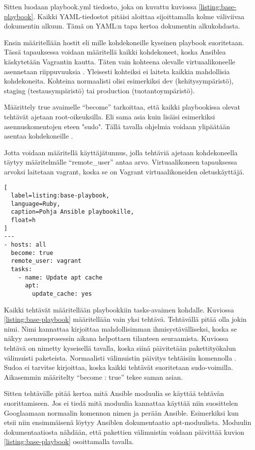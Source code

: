 Sitten luodaan playbook.yml tiedosto, joka on kuvattu kuviossa \ref{listing:base-playbook}. Kaikki YAML-tiedostot pitäisi aloittaa sijoittamalla kolme väliviivaa dokumentin alkuun. Tämä on YAML:n tapa kertoa dokumentin alkukohdasta.

Ensin määritellään hostit eli mille kohdekoneille kyseinen playbook suoritetaan. Tässä tapauksessa voidaan määritellä kaikki kohdekoneet, koska Ansiblea käskytetään Vagrantin kautta. Täten vain kohteena olevalle virtuaalikoneelle asennetaan riippuvuuksia \cite{link:comprehensive-ansible-tutorial}. Yleisesti kohteiksi ei laiteta kaikkia mahdollisia kohdekoneita. Kohteina normaalisti olisi esimerkiksi dev (kehitysympäristö), staging (testausympäristö) tai production (tuotantoympäristö).

Määrittely true avaimelle \enquote{become} tarkoittaa, että kaikki playbookissa olevat tehtävät ajetaan root-oikeuksilla. Eli sama asia kuin lisäisi esimerkiksi asennuskomentojen eteen "sudo". Tällä tavalla ohjelmia voidaan ylipäätään asentaa kohdekoneille \cite{link:ansible-configuration-file}.

Jotta voidaan määritellä käyttäjätunnus, jolla tehtäviä ajetaan kohdekoneella täytyy määritelmälle \enquote{remote\_user} antaa arvo. Virtuaalikoneen tapauksessa arvoksi laitetaan vagrant, koska se on Vagrant virtuaalikoneiden oletuskäyttäjä.

\begin{lstlisting}[
  label=listing:base-playbook,
  language=Ruby,
  caption=Pohja Ansible playbookille,
  float=h
]
---
- hosts: all
  become: true
  remote_user: vagrant
  tasks:
    - name: Update apt cache
      apt:
        update_cache: yes
\end{lstlisting}

Kaikki tehtävät määritellään playbookkiin tasks-avaimen kohdalle. Kuviossa \ref{listing:base-playbook} määritellään vain yksi tehtävä. Tehtävällä pitää olla jokin nimi. Nimi kannattaa kirjoittaa mahdollisimman ihmisystävälliseksi, koska se näkyy asennusprosessin aikana helpottaen tilanteen seuraamista. Kuviossa tehtävä on nimetty kyseisellä tavalla, koska siinä päivitetään pakettityökalun välimuisti paketeista. Normaalisti välimuistin päivitys tehtäisiin komennolla . Sudoa ei tarvitse kirjoittaa, koska kaikki tehtävät suoritetaan sudo-voimilla. Aikasemmin määritelty \enquote{become : true} tekee saman asian.

Sitten tehtävälle pitää kertoa mitä Ansible moduulia se käyttää tehtävän suorittamiseen. Jos ei tiedä mitä moduulia kannattaa käyttää niin suosittelen Googlaamaan normaalin komennon nimen ja perään Ansible. Esimerkiksi kun etsii  niin ensimmäisenä löytyy Ansiblen dokumentaatio apt-moduulista. Moduulin dokumentaatiosta nähdään, että pakettien välimuistin voidaan päivittää kuvion \ref{listing:base-playbook} osoittamalla tavalla.

